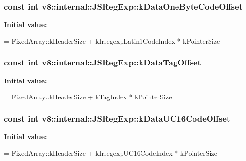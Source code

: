 \subsubsection[{\texorpdfstring{k\+Data\+One\+Byte\+Code\+Offset}{kDataOneByteCodeOffset}}]{\setlength{\rightskip}{0pt plus 5cm}const int v8\+::internal\+::\+J\+S\+Reg\+Exp\+::k\+Data\+One\+Byte\+Code\+Offset\hspace{0.3cm}{\ttfamily [static]}}\hypertarget{classv8_1_1internal_1_1_j_s_reg_exp_a57250d6db8aab356a2e0bd24494f91e3}{}\label{classv8_1_1internal_1_1_j_s_reg_exp_a57250d6db8aab356a2e0bd24494f91e3}
{\bfseries Initial value\+:}
\begin{DoxyCode}
=
      FixedArray::kHeaderSize + kIrregexpLatin1CodeIndex * kPointerSize
\end{DoxyCode}
\subsubsection[{\texorpdfstring{k\+Data\+Tag\+Offset}{kDataTagOffset}}]{\setlength{\rightskip}{0pt plus 5cm}const int v8\+::internal\+::\+J\+S\+Reg\+Exp\+::k\+Data\+Tag\+Offset\hspace{0.3cm}{\ttfamily [static]}}\hypertarget{classv8_1_1internal_1_1_j_s_reg_exp_a77317a79138a05743d0d3b2361243192}{}\label{classv8_1_1internal_1_1_j_s_reg_exp_a77317a79138a05743d0d3b2361243192}
{\bfseries Initial value\+:}
\begin{DoxyCode}
=
      FixedArray::kHeaderSize + kTagIndex * kPointerSize
\end{DoxyCode}
\subsubsection[{\texorpdfstring{k\+Data\+U\+C16\+Code\+Offset}{kDataUC16CodeOffset}}]{\setlength{\rightskip}{0pt plus 5cm}const int v8\+::internal\+::\+J\+S\+Reg\+Exp\+::k\+Data\+U\+C16\+Code\+Offset\hspace{0.3cm}{\ttfamily [static]}}\hypertarget{classv8_1_1internal_1_1_j_s_reg_exp_a949f4bc648cd6a11a8e0e01b5a4e9641}{}\label{classv8_1_1internal_1_1_j_s_reg_exp_a949f4bc648cd6a11a8e0e01b5a4e9641}
{\bfseries Initial value\+:}
\begin{DoxyCode}
=
      FixedArray::kHeaderSize + kIrregexpUC16CodeIndex * kPointerSize
\end{DoxyCode}
